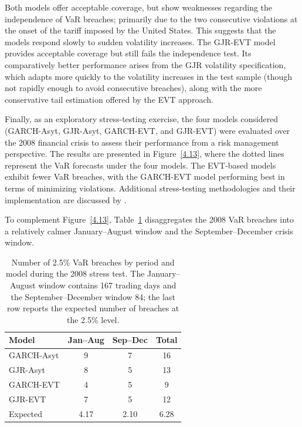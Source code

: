Both models offer acceptable coverage, but show weaknesses regarding the independence of VaR breaches; primarily due to the two consecutive violations at the onset of the tariff imposed by the United States. This suggests that the models respond slowly to sudden volatility increases. The GJR-EVT model provides acceptable coverage but still fails the independence test. Its comparatively better performance arises from the GJR volatility specification, which adapts more quickly to the volatility increases in the test sample (though not rapidly enough to avoid consecutive breaches), along with the more conservative tail estimation offered by the EVT approach.

Finally, as an exploratory stress-testing exercise, the four models considered (GARCH-Asyt, GJR-Asyt, GARCH-EVT, and GJR-EVT) were evaluated over the 2008 financial crisis to assess their performance from a risk management perspective. The results are presented in Figure~\ref{4.13}, where the dotted lines represent the VaR forecasts under the four models. The EVT-based models exhibit fewer VaR breaches, with the GARCH-EVT model performing best in terms of minimizing violations. Additional stress-testing methodologies and their implementation are discussed by .

To complement Figure~\ref{4.13}, Table~\ref{tab:4.4} disaggregates the 2008 VaR breaches into a relatively calmer January--August window and the September--December crisis window.

\begin{table}[H]
\centering
\begin{tabular}{lccc}
\toprule
\textbf{Model} & \textbf{Jan--Aug} & \textbf{Sep--Dec} & \textbf{Total} \\
\midrule
GARCH-Asyt & 9 & 7 & 16 \\
GJR-Asyt   & 8 & 5 & 13 \\
GARCH-EVT  & 4 & 5 & 9  \\
GJR-EVT    & 7 & 5 & 12 \\
\midrule
Expected   & 4.17 & 2.10 & 6.28 \\
\bottomrule
\end{tabular}
\caption{Number of 2.5\% VaR breaches by period and model during the 2008 stress test. The January--August window contains 167 trading days and the September--December window 84; the last row reports the expected number of breaches at the 2.5\% level.}
\label{tab:4.4}
\end{table}

